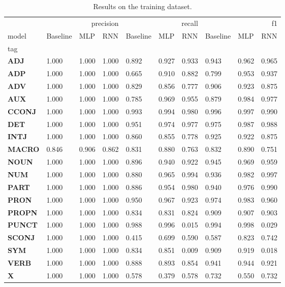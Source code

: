 \begin{table}
\caption{Results on the training dataset.}
\label{tab::ex_2_train}
\begin{tabular}{|l||l||l||l||l||l||l||l||l||l|}
\toprule
 & \multicolumn{3}{r}{precision} & \multicolumn{3}{r}{recall} & \multicolumn{3}{r}{f1} \\
model & Baseline & MLP & RNN & Baseline & MLP & RNN & Baseline & MLP & RNN \\
tag &  &  &  &  &  &  &  &  &  \\
\midrule
\textbf{ADJ} & 1.000 & 1.000 & 1.000 & 0.892 & 0.927 & 0.933 & 0.943 & 0.962 & 0.965 \\
\textbf{ADP} & 1.000 & 1.000 & 1.000 & 0.665 & 0.910 & 0.882 & 0.799 & 0.953 & 0.937 \\
\textbf{ADV} & 1.000 & 1.000 & 1.000 & 0.829 & 0.856 & 0.777 & 0.906 & 0.923 & 0.875 \\
\textbf{AUX} & 1.000 & 1.000 & 1.000 & 0.785 & 0.969 & 0.955 & 0.879 & 0.984 & 0.977 \\
\textbf{CCONJ} & 1.000 & 1.000 & 1.000 & 0.993 & 0.994 & 0.980 & 0.996 & 0.997 & 0.990 \\
\textbf{DET} & 1.000 & 1.000 & 1.000 & 0.951 & 0.974 & 0.977 & 0.975 & 0.987 & 0.988 \\
\textbf{INTJ} & 1.000 & 1.000 & 1.000 & 0.860 & 0.855 & 0.778 & 0.925 & 0.922 & 0.875 \\
\textbf{MACRO} & 0.846 & 0.906 & 0.862 & 0.831 & 0.880 & 0.763 & 0.832 & 0.890 & 0.751 \\
\textbf{NOUN} & 1.000 & 1.000 & 1.000 & 0.896 & 0.940 & 0.922 & 0.945 & 0.969 & 0.959 \\
\textbf{NUM} & 1.000 & 1.000 & 1.000 & 0.880 & 0.965 & 0.994 & 0.936 & 0.982 & 0.997 \\
\textbf{PART} & 1.000 & 1.000 & 1.000 & 0.886 & 0.954 & 0.980 & 0.940 & 0.976 & 0.990 \\
\textbf{PRON} & 1.000 & 1.000 & 1.000 & 0.950 & 0.967 & 0.923 & 0.974 & 0.983 & 0.960 \\
\textbf{PROPN} & 1.000 & 1.000 & 1.000 & 0.834 & 0.831 & 0.824 & 0.909 & 0.907 & 0.903 \\
\textbf{PUNCT} & 1.000 & 1.000 & 1.000 & 0.988 & 0.996 & 0.015 & 0.994 & 0.998 & 0.029 \\
\textbf{SCONJ} & 1.000 & 1.000 & 1.000 & 0.415 & 0.699 & 0.590 & 0.587 & 0.823 & 0.742 \\
\textbf{SYM} & 1.000 & 1.000 & 1.000 & 0.834 & 0.851 & 0.009 & 0.909 & 0.919 & 0.018 \\
\textbf{VERB} & 1.000 & 1.000 & 1.000 & 0.888 & 0.893 & 0.854 & 0.941 & 0.944 & 0.921 \\
\textbf{X} & 1.000 & 1.000 & 1.000 & 0.578 & 0.379 & 0.578 & 0.732 & 0.550 & 0.732 \\
\bottomrule
\end{tabular}
\end{table}
